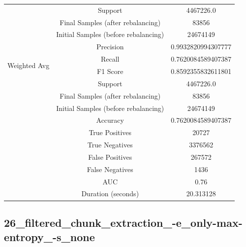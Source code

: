 \begin{longtable}{|c|c|c|}
 & Support & 4467226.0 \\
 & Final Samples (after rebalancing) & 83856 \\
 & Initial Samples (before rebalancing) & 24674149 \\
\hline
\multirow{4}{*}{Weighted Avg} & Precision & 0.9932820994307777 \\
 & Recall & 0.7620084589407387 \\
 & F1 Score & 0.8592355832611801 \\
 & Support & 4467226.0 \\
 & Final Samples (after rebalancing) & 83856 \\
 & Initial Samples (before rebalancing) & 24674149 \\
\hline
& Accuracy & 0.7620084589407387 \\ \hline
& True Positives & 20727 \\ \hline
& True Negatives & 3376562 \\ \hline
& False Positives & 267572 \\ \hline
& False Negatives & 1436 \\ \hline
& AUC & 0.76 \\ \hline
& Duration (seconds) & 20.313128 \\ \hline
\end{longtable}


\subsection{26\_filtered\_chunk\_extraction\_-e\_only-max-entropy\_-s\_none}

